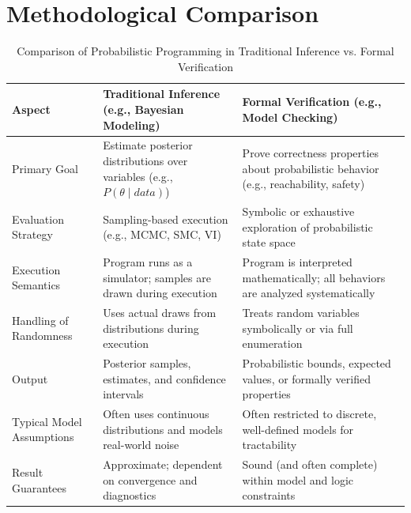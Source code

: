 \section{Methodological Comparison}
\begin{table}[h]
  \centering
  \caption{Comparison of Probabilistic Programming in Traditional Inference vs. Formal Verification}
  \begin{tabular}{|p{4.5cm}|p{5.5cm}|p{5.5cm}|}
    \hline
    \textbf{Aspect}           & \textbf{Traditional Inference (e.g., Bayesian Modeling)}                      & \textbf{Formal Verification (e.g., Model Checking)}                                    \\
    \hline
    Primary Goal              & Estimate posterior distributions over variables (e.g., $P(\theta \mid data)$) & Prove correctness properties about probabilistic behavior (e.g., reachability, safety) \\
    \hline
    Evaluation Strategy       & Sampling-based execution (e.g., MCMC, SMC, VI)                                & Symbolic or exhaustive exploration of probabilistic state space                        \\
    \hline
    Execution Semantics       & Program runs as a simulator; samples are drawn during execution               & Program is interpreted mathematically; all behaviors are analyzed systematically       \\
    \hline
    Handling of Randomness    & Uses actual draws from distributions during execution                         & Treats random variables symbolically or via full enumeration                           \\
    \hline
    Output                    & Posterior samples, estimates, and confidence intervals                        & Probabilistic bounds, expected values, or formally verified properties                 \\
    \hline
    Typical Model Assumptions & Often uses continuous distributions and models real-world noise               & Often restricted to discrete, well-defined models for tractability                     \\
    \hline
    Result Guarantees         & Approximate; dependent on convergence and diagnostics                         & Sound (and often complete) within model and logic constraints                          \\
    \hline
  \end{tabular}
  \label{tab:inference_vs_verification}
\end{table}


